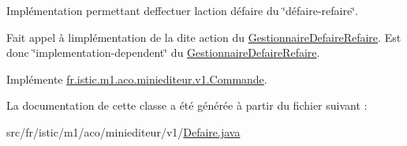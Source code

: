 Implémentation permettant d\textquotesingle{}effectuer l\textquotesingle{}action défaire du \char`\"{}défaire-\/refaire\char`\"{}. 

Fait appel à l\textquotesingle{}implémentation de la dite action du \hyperlink{interfacefr_1_1istic_1_1m1_1_1aco_1_1miniediteur_1_1v1_1_1GestionnaireDefaireRefaire}{Gestionnaire\+Defaire\+Refaire}. Est donc \char`\"{}implementation-\/dependent\char`\"{} du \hyperlink{interfacefr_1_1istic_1_1m1_1_1aco_1_1miniediteur_1_1v1_1_1GestionnaireDefaireRefaire}{Gestionnaire\+Defaire\+Refaire}. 

Implémente \hyperlink{interfacefr_1_1istic_1_1m1_1_1aco_1_1miniediteur_1_1v1_1_1Commande_a87a8a55bac4e81e32339248f79f7de4f}{fr.\+istic.\+m1.\+aco.\+miniediteur.\+v1.\+Commande}.



La documentation de cette classe a été générée à partir du fichier suivant \+:\begin{DoxyCompactItemize}
\item 
src/fr/istic/m1/aco/miniediteur/v1/\hyperlink{Defaire_8java}{Defaire.\+java}\end{DoxyCompactItemize}
